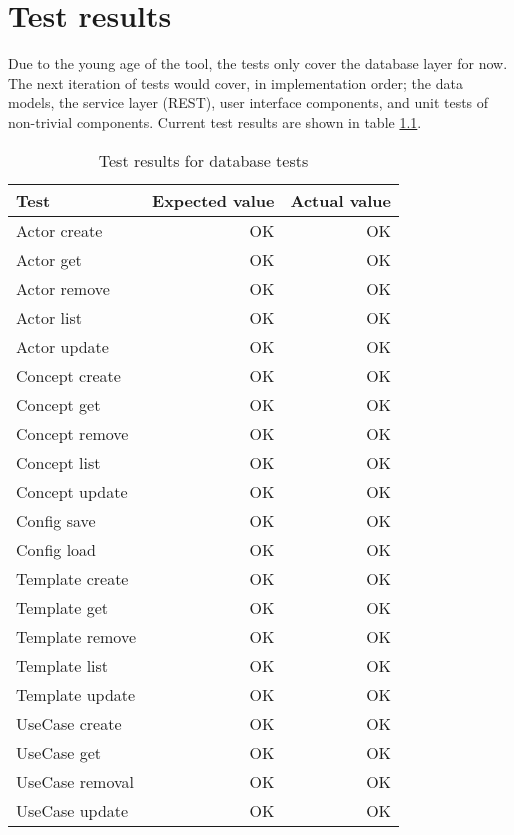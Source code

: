 \chapter{Test results}
\label{appendix:tests}
Due to the young age of the tool, the tests only cover the database layer for now. The next iteration of tests would cover, in implementation order; the data models, the service layer (REST), user interface components, and unit tests of non-trivial components. Current test results are shown in table \ref{tab:test-results-database}.
\begin{table}[!htbp]
\centering
\begin{tabular}{ | l | r | r | }
   \hline
   Test            & Expected value & Actual value \\ \hline
   Actor create    & OK             & OK           \\
   Actor get       & OK             & OK           \\
   Actor remove    & OK             & OK           \\
   Actor list      & OK             & OK           \\
   Actor update    & OK             & OK           \\
   Concept create  & OK             & OK           \\ 
   Concept get     & OK             & OK           \\
   Concept remove  & OK             & OK           \\
   Concept list    & OK             & OK           \\
   Concept update  & OK             & OK           \\
   Config save     & OK             & OK           \\
   Config load     & OK             & OK           \\
   Template create & OK             & OK           \\
   Template get    & OK             & OK           \\
   Template remove & OK             & OK           \\
   Template list   & OK             & OK           \\
   Template update & OK             & OK           \\
   UseCase create  & OK             & OK           \\
   UseCase get     & OK             & OK           \\
   UseCase removal & OK             & OK           \\
   UseCase update  & OK             & OK           \\
   \hline
\end{tabular}
\caption{Test results for database tests}
\label{tab:test-results-database}
\end{table}